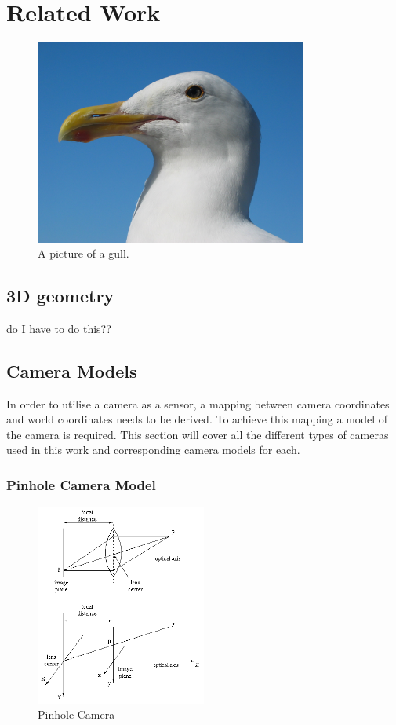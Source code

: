 \chapter{Related Work}
\label{chapter:Related_Work}

\begin{figure}[h!]
  \caption{A picture of a gull.}
  \centering
    \includegraphics[width=0.8\textwidth]{chapters/images/gull}
\end{figure}

\section{3D geometry}

do I have to do this??

\section{Camera Models}

In order to utilise a camera as a sensor, a mapping between camera coordinates and world coordinates
needs to be derived.  To achieve this mapping a model of the camera is required.  This section will
cover all the different types of cameras used in this work and corresponding camera models for
each. 

\subsection{Pinhole Camera Model}

\begin{figure}[h!]
  \caption{Pinhole Camera}
  \centering
    \includegraphics[width=0.5\textwidth]{chapters/images/pinhole_camera}
\end{figure}

